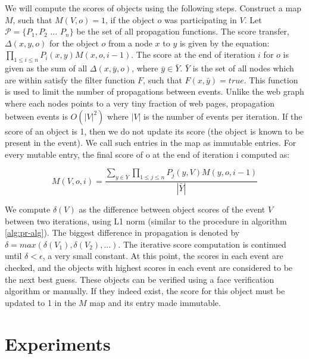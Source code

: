 We will compute the scores of objects using the following steps. Construct a map $M$, such that $M(V, o) = 1$, if the object $o$ was participating in $V$. Let $\mathcal P = \{P_1, P_2 $ ... $ P_n\}$ be the set of all propagation functions. The score transfer, $\Delta(x, y, o)$ for the object $o$ from a node $x$ to $y$ is given by the equation: $\prod_{1 \leq i \leq n} P_i(x, y) M(x, o, i-1)$. The score at the end of iteration $i$ for $o$ is given as the sum of all $\Delta(x, \bar{y}, o)$, where $ \bar{y} \in \bar{Y}$. $\bar{Y}$ is the set of all nodes which are within satisfy the filter function $F$, such that $F(x, \bar{y}) = true$. This function is used to limit the number of propagations between events. Unlike the web graph where each nodes points to a very tiny fraction of web pages, propagation between events is $O(|V|^2)$ where $|V|$ is the number of events per iteration. If the score of an object is 1, then we do not update its score (the object is known to be present in the event). We call such entries in the map as immutable entries. For every mutable entry, the final score of o at the end of iteration i computed as:

\begin{equation}
M(V, o, i) = \frac{\sum_{y \in \bar{Y}} \prod_{1 \leq j \leq n} P_j(y, V) M(y, o, i-1)}{|\bar{Y}|}
\end{equation}

We compute $\delta(V)$ as the difference between object scores of the event $V$ between two iterations, using L1 norm (similar to the procedure in algorithm \ref{alg:pr-alg}). The biggest difference in propagation is denoted by $\delta = max(\delta(V_1), \delta(V_2), ... )$. The iterative score computation is continued until $\delta < \epsilon$, a very small constant. At this point, the scores in each event are checked, and the objects with highest scores in each event are considered to be the next best guess. These objects can be verified using a face verification algorithm or manually. If they indeed exist, the score for this object must be updated to 1 in the $M$ map and its entry made immutable. 

\section{Experiments}

